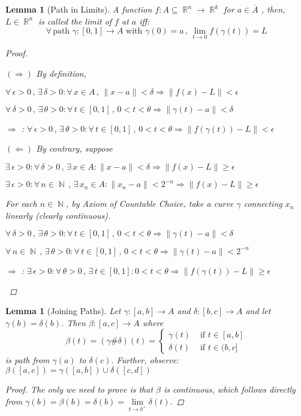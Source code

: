 \documentclass[12pt]{article}
\let\RA\Rightarrow
\let\LA\Leftarrow
\let\ee\epsilon
\newcommand{\Forall}[1]{\forall\,{#1}\,,\,}
\newcommand{\Exist}[1]{\exists\,{#1}:}
\DeclareMathOperator{\R}{\mathbb{R}}
\DeclareMathOperator{\N}{\mathbb{N}}
\newcommand{\cl}[1]{\overline{#1}}
\newtheorem{lemma}[theorem]{Lemma}
\begin{document}
\begin{lemma}[Path in Limits]
  A function $f:A\subseteq \R^n\to \R^k$ for $a\in\cl{A}$ , then, $L\in\R^n$ is called the limit of $f$ at $a$ iff: $$\Forall{\text{path }\gamma:[0,1]\to A\text{ with }\gamma(0)=a}\lim_{t\to 0}f(\gamma(t))=L$$
  \begin{proof}
    \begin{compactitem}
      \item[$(\RA)$] By definition,\begin{compactitem}
        \item[] $\Forall{\ee>0}\Exist{\delta>0}\Forall{x\in A}\|x-a\|<\delta\RA\|f(x)-L\|<\ee$
        \item[] $\Forall{\delta>0}\Exist{\theta>0}\Forall{t\in [0,1]}0<t<\theta\RA\|\gamma(t)-a\|<\delta$
        \item[$\RA$]: $\Forall{\ee>0}\Exist{\theta>0}\Forall{t\in [0,1]}0<t<\theta\RA \|f(\gamma(t))-L\|<\ee$ 
      \end{compactitem}
      \item[$(\LA)$] By contrary, suppose \begin{compactitem}
        \item[] $\Exist{\ee>0}\Forall{\delta>0}\Exist{x\in A}\|x-a\|<\delta\RA\|f(x)-L\|\geq \ee$
        \item[] $\Exist{\ee>0}\Forall{n\in\N}\Exist{x_n\in A}\|x_n-a\|<2^{-n}\RA\|f(x)-L\|\geq \ee$
        \item[] For each $n\in\N$, by Axiom of Countable Choice, take a curve $\gamma$ connecting $x_n$ linearly (clearly continuous).
        \item[] $\Forall{\delta>0}\Exist{\theta>0}\Forall{t\in [0,1]}0<t<\theta\RA\|\gamma(t)-a\|<\delta$
        \item[] $\Forall{n\in\N}\Exist{\theta>0}\Forall{t\in [0,1]}0<t<\theta\RA\|\gamma(t)-a\|< 2^{-n}$
        \item[$\RA$]: $\Exist{\ee>0}\Forall{\theta>0}\Exist{t\in [0,1]}0<t<\theta\RA \|f(\gamma(t))-L\|\geq\ee$ 
      \end{compactitem}
    \end{compactitem}
  \end{proof}
\end{lemma}

\begin{lemma}[Joining Paths]
  \label{join_paths}
  Let $\gamma:[a,b]\to A$ and $\delta:[b,c]\to A$ and let $\gamma(b)=\delta(b)$. Then $\beta:[a,c]\to A$ where $$\beta(t)=(\gamma\#\delta)(t)=\begin{cases}
    \gamma(t)&\text{ if }t\in [a,b]\\
    \delta(t)&\text{ if }t\in (b,c]
  \end{cases}$$ is path from $\gamma(a)$ to $\delta(c)$. Further, observe: $\beta([a,c])=\gamma([a,b])\cup\delta([c,d])$
  \begin{proof}
    The only we need to prove is that $\beta$ is continuous, which follows directly from $\gamma(b)=\beta(b)=\delta(b)=\lim\limits_{t\to b^{+}}\delta(t)$.
  \end{proof}
\end{lemma}
\end{document}
